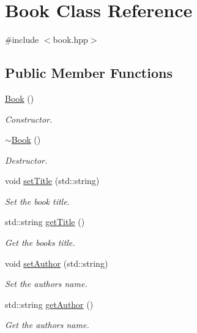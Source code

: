 \hypertarget{classBook}{}\section{Book Class Reference}
\label{classBook}


{\ttfamily \#include $<$book.\+hpp$>$}

\subsection*{Public Member Functions}
\begin{DoxyCompactItemize}
\item 
\hyperlink{classBook_a2eac9e235a08763158f78533f7a83e1f}{Book} ()
\begin{DoxyCompactList}\small\item\em Constructor. \end{DoxyCompactList}\item 
\hyperlink{classBook_a0ba8eceb34ea1301bc08942e37824767}{$\sim$\+Book} ()
\begin{DoxyCompactList}\small\item\em Destructor. \end{DoxyCompactList}\item 
void \hyperlink{classBook_af21eb2bd1abab3e7908fb4610d770b08}{set\+Title} (std\+::string)
\begin{DoxyCompactList}\small\item\em Set the book title. \end{DoxyCompactList}\item 
std\+::string \hyperlink{classBook_a285c04c195e3e1f11d465b07357308a7}{get\+Title} ()
\begin{DoxyCompactList}\small\item\em Get the book\textquotesingle{}s title. \end{DoxyCompactList}\item 
void \hyperlink{classBook_a8e1a623d5795141facc30a6d298f3c75}{set\+Author} (std\+::string)
\begin{DoxyCompactList}\small\item\em Set the author\textquotesingle{}s name. \end{DoxyCompactList}\item 
std\+::string \hyperlink{classBook_a7e8ae0106c07e4208d4b8640bc6af7f7}{get\+Author} ()
\begin{DoxyCompactList}\small\item\em Get the author\textquotesingle{}s name. \end{DoxyCompactList}\item 

\end{DoxyCompactItemize}
